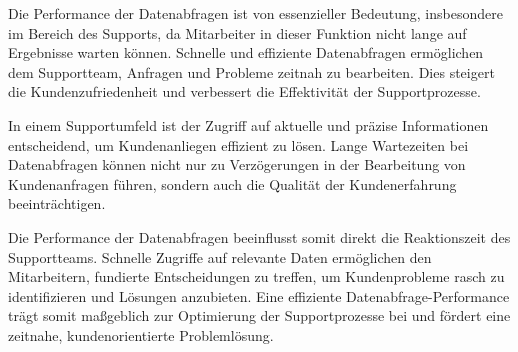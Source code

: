 Die Performance der Datenabfragen ist von essenzieller Bedeutung, insbesondere im Bereich des Supports, da Mitarbeiter in dieser Funktion nicht lange auf Ergebnisse warten können. Schnelle und effiziente Datenabfragen ermöglichen dem Supportteam, Anfragen und Probleme zeitnah zu bearbeiten. Dies steigert die Kundenzufriedenheit und verbessert die Effektivität der Supportprozesse.

In einem Supportumfeld ist der Zugriff auf aktuelle und präzise Informationen entscheidend, um Kundenanliegen effizient zu lösen. Lange Wartezeiten bei Datenabfragen können nicht nur zu Verzögerungen in der Bearbeitung von Kundenanfragen führen, sondern auch die Qualität der Kundenerfahrung beeinträchtigen.

Die Performance der Datenabfragen beeinflusst somit direkt die Reaktionszeit des Supportteams. Schnelle Zugriffe auf relevante Daten ermöglichen den Mitarbeitern, fundierte Entscheidungen zu treffen, um Kundenprobleme rasch zu identifizieren und Lösungen anzubieten. Eine effiziente Datenabfrage-Performance trägt somit maßgeblich zur Optimierung der Supportprozesse bei und fördert eine zeitnahe, kundenorientierte Problemlösung.